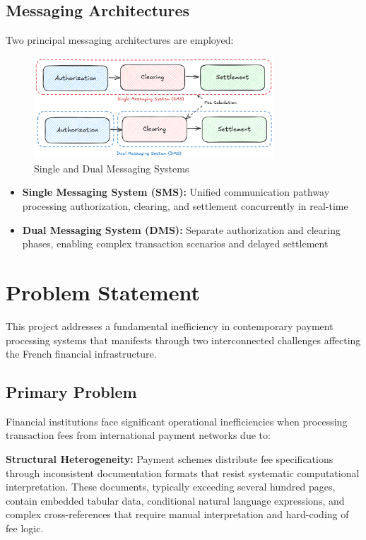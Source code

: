 \subsection{Messaging Architectures}

Two principal messaging architectures are employed:

\begin{figure}[H]
    \centering
    \includegraphics[width=0.8\textwidth]{img/Txn_SMS_DMS.png}
    \caption{Single and Dual Messaging Systems}
\end{figure}

\begin{itemize}
   \item \textbf{Single Messaging System (SMS):} Unified communication pathway processing authorization, clearing, and settlement concurrently in real-time
   \item \textbf{Dual Messaging System (DMS):} Separate authorization and clearing phases, enabling complex transaction scenarios and delayed settlement
\end{itemize}

\section{Problem Statement}

This project addresses a fundamental inefficiency in contemporary payment processing systems that manifests through two interconnected challenges affecting the French financial infrastructure.

\subsection{Primary Problem}

Financial institutions face significant operational inefficiencies when processing transaction fees from international payment networks due to:

\textbf{Structural Heterogeneity:} Payment schemes distribute fee specifications through inconsistent documentation formats that resist systematic computational interpretation. These documents, typically exceeding several hundred pages, contain embedded tabular data, conditional natural language expressions, and complex cross-references that require manual interpretation and hard-coding of fee logic.

